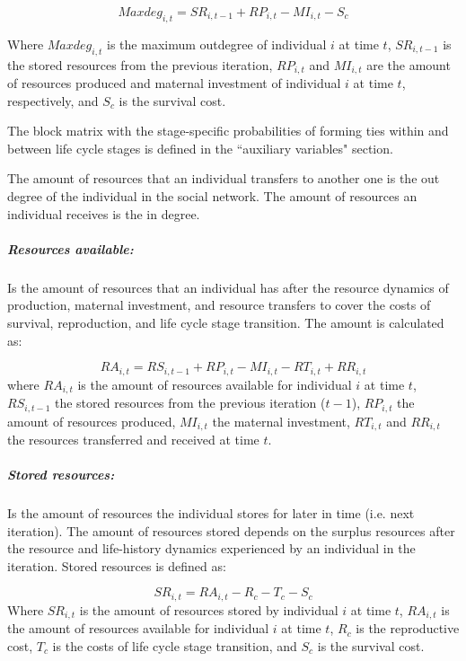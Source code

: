 \documentclass{article}
\begin{document}
\begin{equation}
    Maxdeg_{i,t}=SR_{i,t-1}+RP_{i,t}-MI_{i,t}-S_c
\end{equation}

Where $Maxdeg_{i,t}$ is the maximum outdegree of individual $i$ at time $t$, $SR_{i,t-1}$ is the stored resources from the previous iteration, $RP_{i,t}$ and $MI_{i,t}$ are the amount of resources produced and maternal investment of individual $i$ at time $t$, respectively, and $S_c$ is the survival cost.

The block matrix with the stage-specific probabilities of forming ties within and between life cycle stages is defined in the ``auxiliary variables" section.

The amount of resources that an individual transfers to another one is the out degree of the individual in the social network. The amount of resources an individual receives is the in degree.

\subparagraph{Resources available:}

Is the amount of resources that an individual has after the resource dynamics of production, maternal investment, and resource transfers to cover the costs of survival, reproduction, and life cycle stage transition. The amount is calculated as:

\begin{equation}
    RA_{i,t}=RS_{i,t-1}+RP_{i,t}-MI_{i,t}-RT_{i,t}+RR_{i,t}        
\end{equation}
        where $RA_{i,t}$ is the amount of resources available for individual $i$ at time $t$, $RS_{i,t-1}$ the stored resources from the previous iteration ($t-1$), $RP_{i,t}$ the amount of resources produced, $MI_{i,t}$ the maternal investment, $RT_{i,t}$ and $RR_{i,t}$ the resources transferred and received at time $t$.

\subparagraph{Stored resources:}      

Is the amount of resources the individual stores for later in time (i.e. next iteration). The amount of resources stored depends on the surplus resources after the resource and life-history dynamics experienced by an individual in the iteration. Stored resources is defined as:

\begin{equation}
    SR_{i,t}=RA_{i,t} - R_c - T_c - S_c 
\end{equation}
    Where $SR_{i,t}$ is the amount of resources stored by individual $i$ at time $t$, $RA_{i,t}$ is the amount of resources available for individual $i$ at time $t$, $R_c$ is the reproductive cost, $T_c$ is the costs of life cycle stage transition, and $S_c$ is the survival cost.
    
\end{document}

